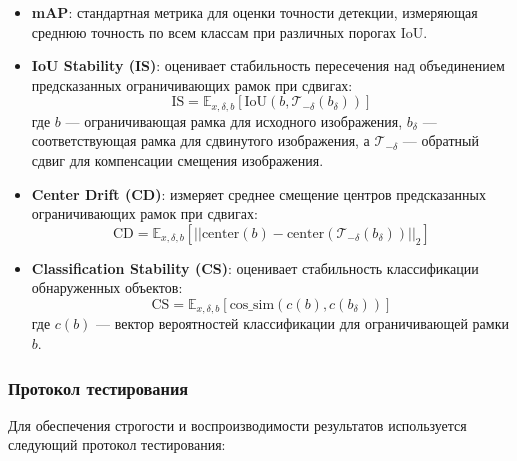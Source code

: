 \begin{itemize}
    \item \textbf{mAP}: стандартная метрика для оценки точности детекции, измеряющая среднюю точность по всем классам при различных порогах IoU.
    
    \item \textbf{IoU Stability (IS)}: оценивает стабильность пересечения над объединением предсказанных ограничивающих рамок при сдвигах:
    \begin{equation}
    \text{IS} = \mathbb{E}_{x, \delta, b} [\text{IoU}(b, \mathcal{T}_{-\delta}(b_{\delta}))]
    \end{equation}
    где $b$ — ограничивающая рамка для исходного изображения, $b_{\delta}$ — соответствующая рамка для сдвинутого изображения, а $\mathcal{T}_{-\delta}$ — обратный сдвиг для компенсации смещения изображения.
    
    \item \textbf{Center Drift (CD)}: измеряет среднее смещение центров предсказанных ограничивающих рамок при сдвигах:
    \begin{equation}
    \text{CD} = \mathbb{E}_{x, \delta, b} [||\text{center}(b) - \text{center}(\mathcal{T}_{-\delta}(b_{\delta}))||_2]
    \end{equation}
    
    \item \textbf{Classification Stability (CS)}: оценивает стабильность классификации обнаруженных объектов:
    \begin{equation}
    \text{CS} = \mathbb{E}_{x, \delta, b} [\text{cos\_sim}(c(b), c(b_{\delta}))]
    \end{equation}
    где $c(b)$ — вектор вероятностей классификации для ограничивающей рамки $b$.
\end{itemize}

\subsubsection{Протокол тестирования}
\label{sec:evaluation:protocol}

Для обеспечения строгости и воспроизводимости результатов используется следующий протокол тестирования:

